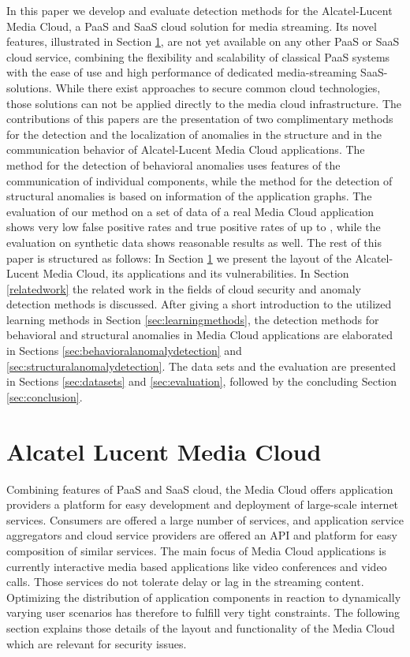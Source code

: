 \documentclass{llncs}
\begin{document}
In this paper we develop and evaluate detection methods for the Alcatel-Lucent Media Cloud, a PaaS and SaaS cloud solution for media streaming. Its novel features, illustrated in Section \ref{alcatellucentmediacloud}, are not yet available on any other PaaS or SaaS cloud service, combining the flexibility and scalability of classical PaaS systems with the ease of use and high performance of dedicated media-streaming SaaS-solutions. While there exist approaches to secure common cloud technologies, those solutions can not be applied directly to the media cloud infrastructure. 
The contributions of this papers are the presentation of two complimentary methods for the detection and the localization of anomalies in the structure and in the communication behavior of Alcatel-Lucent Media Cloud applications. The method for the detection of behavioral anomalies uses features of the communication of individual components, while the method for the detection of structural anomalies is based on information of the application graphs. The evaluation of our method on a set of data of a real Media Cloud application shows very low false positive rates and true positive rates of up to , while the evaluation on synthetic data shows reasonable results as well.
The rest of this paper is structured as follows: In Section \ref{alcatellucentmediacloud} we present the layout of the Alcatel-Lucent Media Cloud, its applications and its vulnerabilities. In Section \ref{relatedwork} the related work in the fields of cloud security and anomaly detection methods is discussed. After giving a short introduction to the utilized learning methods in Section \ref{sec:learningmethods}, the detection methods for behavioral and structural anomalies in Media Cloud applications are elaborated in Sections \ref{sec:behavioralanomalydetection} and \ref{sec:structuralanomalydetection}. The data sets and the evaluation are presented in Sections \ref{sec:datasets} and \ref{sec:evaluation}, followed by the concluding Section \ref{sec:conclusion}.
 
\section{Alcatel Lucent Media Cloud}
\label{alcatellucentmediacloud}
Combining features of PaaS and SaaS cloud, the Media Cloud offers application providers a platform for easy development and deployment of large-scale internet services. Consumers are offered a large number of services, and application service aggregators and cloud service providers are offered an API and platform for easy composition of similar services. The main focus of Media Cloud applications is currently interactive media based applications like video conferences and video calls. Those services do not tolerate delay or lag in the streaming content. Optimizing the distribution of application components in reaction to dynamically varying user scenarios has therefore to fulfill very tight constraints. The following section explains those details of the layout and functionality of the Media Cloud which are relevant for security issues.
\end{document}
